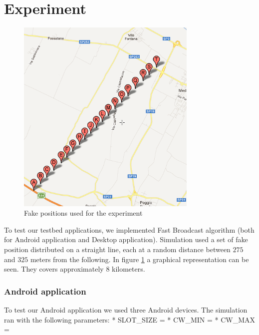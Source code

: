 \section{Experiment}
	\begin{figure}[htbp]
	\centering
	\includegraphics[width=3.4in]{imgs/punti_mappa.png}
	\caption{Fake positions used for the experiment}
	\label{fig:positions_experiment}
	\end{figure}

To test our testbed applications, we implemented Fast Broadcast algorithm (both for Android application and Desktop application). Simulation used a set of fake position distributed on a straight line, each at a random distance between $275$ and $325$ meters from the following. In figure \ref{fig:positions_experiment} a graphical representation can be seen. They covers approximately $8$ kilometers.

\subsubsection{Android application}
To test our Android application we used three Android devices. The simulation ran with the following parameters:
	* SLOT_SIZE = 
	* CW_MIN = 
	* CW_MAX =
	

